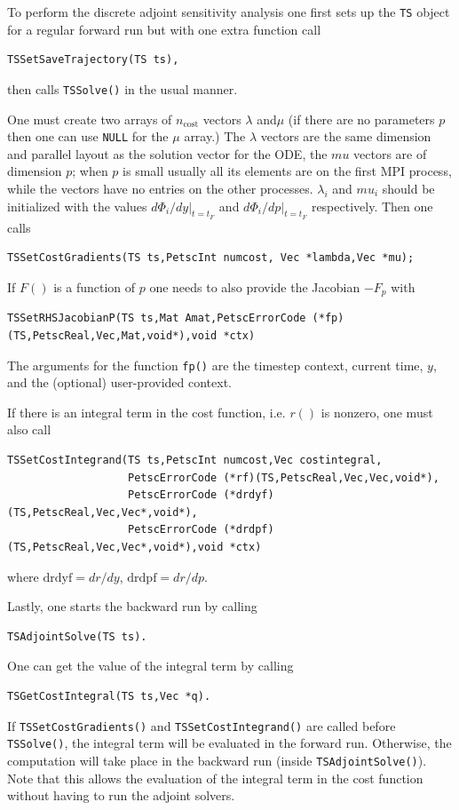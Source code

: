 To perform the discrete adjoint sensitivity analysis one first sets up the \lstinline{TS} object for a regular forward run but with one extra function call
\begin{lstlisting}
TSSetSaveTrajectory(TS ts),
\end{lstlisting}
then calls \lstinline{TSSolve()} in the usual manner.

One must create two arrays of $n_\text{cost}$ vectors $\lambda$ and$\mu$ (if there are no parameters $p$ then one can use \lstinline{NULL} for the $\mu$ array.) The $\lambda$ vectors are the same dimension and parallel layout as the solution vector for the ODE, the $mu$ vectors are of dimension $p$; when $p$ is small usually all its elements are on the first MPI process, while the vectors have no entries on the other processes. $\lambda_i$ and $mu_i$ should be initialized with the values $d\Phi_i/dy|_{t=t_F}$ and $d\Phi_i/dp|_{t=t_F}$ respectively. Then one calls
\begin{lstlisting}
TSSetCostGradients(TS ts,PetscInt numcost, Vec *lambda,Vec *mu);
\end{lstlisting}

If $F()$ is a function of $p$ one needs to also provide the Jacobian $-F_p$ with
\begin{lstlisting}
TSSetRHSJacobianP(TS ts,Mat Amat,PetscErrorCode (*fp)(TS,PetscReal,Vec,Mat,void*),void *ctx)
\end{lstlisting}
The arguments for the function \lstinline{fp()}
are the timestep context, current time, $y$, and the (optional) user-provided context.

If there is an integral term in the cost function, i.e. $r()$ is nonzero, one must also call
\begin{lstlisting}
TSSetCostIntegrand(TS ts,PetscInt numcost,Vec costintegral,
                   PetscErrorCode (*rf)(TS,PetscReal,Vec,Vec,void*),
                   PetscErrorCode (*drdyf)(TS,PetscReal,Vec,Vec*,void*),
                   PetscErrorCode (*drdpf)(TS,PetscReal,Vec,Vec*,void*),void *ctx)
\end{lstlisting}
where $\mathrm{drdyf}= dr /dy$, $\mathrm{drdpf} = dr /dp$.

Lastly, one starts the backward run by calling
\begin{lstlisting}
TSAdjointSolve(TS ts).
\end{lstlisting}

One can get the value of the integral term by calling
\begin{lstlisting}
TSGetCostIntegral(TS ts,Vec *q).
\end{lstlisting}
If \lstinline{TSSetCostGradients()} and \lstinline{TSSetCostIntegrand()} are called before \lstinline{TSSolve()}, the integral term will be evaluated in the forward run.
Otherwise, the computation will take place in the backward run (inside \lstinline{TSAdjointSolve()}).
Note that this allows the evaluation of the integral term in the cost function without having to run the adjoint solvers.

